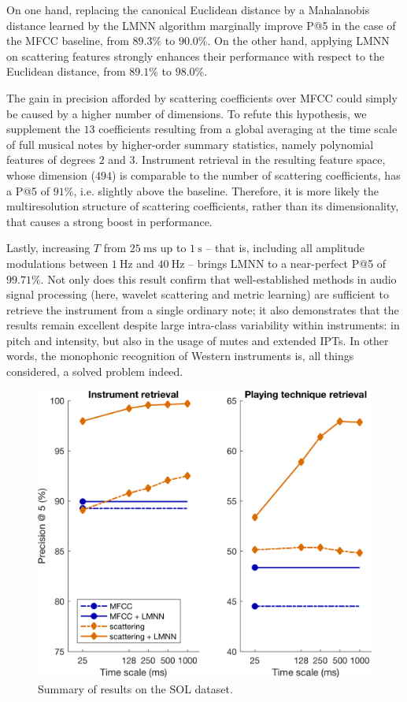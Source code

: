 \documentclass{article}
\makeatletter
\newcommand*{\ie}{i.e.\@\xspace}
\makeatother
\begin{document}
On one hand, replacing the canonical Euclidean distance by a Mahalanobis distance learned by the LMNN algorithm marginally improve P@5 in the case of the MFCC baseline, from $89.3\%$ to $90.0\%$.
On the other hand, applying LMNN on scattering features strongly enhances their performance with respect to the Euclidean distance, from $89.1\%$ to $98.0\%$.

The gain in precision afforded by scattering coefficients over MFCC could simply be caused by a higher number of dimensions.
To refute this hypothesis, we supplement the $13$ coefficients resulting from a global averaging at the time scale of full musical notes by higher-order summary statistics, namely polynomial features of degrees $2$ and $3$.
Instrument retrieval in the resulting feature space, whose dimension ($494$) is comparable to the number of scattering coefficients, has a P@5 of $91\%$, \ie{} slightly above the baseline.
Therefore, it is more likely the multiresolution structure of scattering coefficients, rather than its dimensionality, that causes a strong boost in performance.

Lastly, increasing $T$ from $\SI{25}{\milli\second}$ up to $\SI{1}{\second}$ -- that is, including all amplitude modulations between $\SI{1}{\Hz}$ and $\SI{40}{\Hz}$ -- brings LMNN to a near-perfect P@5 of $99.71\%$.
Not only does this result confirm that well-established methods in audio signal processing (here, wavelet scattering and metric learning) are sufficient to retrieve the instrument from a single ordinary note; it also demonstrates that the results remain excellent despite large intra-class variability within instruments: in pitch and intensity, but also in the usage of mutes and extended IPTs.
In other words, the monophonic recognition of Western instruments is, all things considered, a solved problem indeed.

\begin{figure}
\includegraphics[width=\linewidth,keepaspectratio]{./figs/results/results.png}
\caption{Summary of results on the SOL dataset.}
\label{fig:results}
\end{figure}
\end{document}
